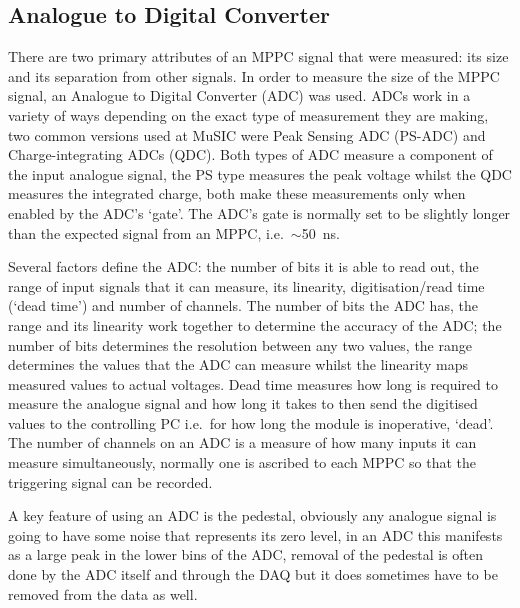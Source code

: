 
\subsection{Analogue to Digital Converter} %
\label{ssub:analogue_to_digital_converter}
There are two primary attributes of an MPPC signal that were measured: its size and its separation from other signals. In order to measure the size of the MPPC signal, an Analogue to Digital Converter (ADC) was used. ADCs work in a variety of ways depending on the exact type of measurement they are making, two common versions used at MuSIC were Peak Sensing ADC (PS-ADC) and Charge-integrating ADCs (QDC). Both types of ADC measure a component of the input analogue signal, the PS type measures the peak voltage whilst the QDC measures the integrated charge, both make these measurements only when enabled by the ADC's `gate'. The ADC's gate is normally set to be slightly longer than the expected signal from an MPPC, i.e.\ \( \sim \)50~ns. 

Several factors define the ADC: the number of bits it is able to read out, the range of input signals that it can measure, its linearity, digitisation/read time (`dead time') and number of channels. The number of bits the ADC has, the range and its linearity work together to determine the accuracy of the ADC; the number of bits determines the resolution between any two values, the range determines the values that the ADC can measure whilst the linearity maps measured values to actual voltages. Dead time measures how long is required to measure the analogue signal and how long it takes to then send the digitised values to the controlling PC i.e.\ for how long the module is inoperative, `dead'. The number of channels on an ADC is a measure of how many inputs it can measure simultaneously, normally one is ascribed to each MPPC so that the triggering signal can be recorded.

A key feature of using an ADC is the pedestal, obviously any analogue signal is going to have some noise that represents its zero level, in an ADC this manifests as a large peak in the lower bins of the ADC, removal of the pedestal is often done by the ADC itself and through the DAQ but it does sometimes have to be removed from the data as well.


